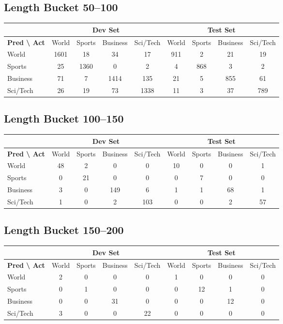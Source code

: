 \documentclass[12pt,a4paper,english]{article}
\begin{document}
\subsection{Length Bucket 50--100}
\begin{tabular}{|l|cccc|cccc|}
\hline
 & \multicolumn{4}{c|}{Dev Set} & \multicolumn{4}{c|}{Test Set} \\ \hline
\textbf{Pred \textbackslash{} Act} & World & Sports & Business & Sci/Tech & World & Sports & Business & Sci/Tech \\ \hline
World    & 1601 & 18  & 34  & 17  & 911 & 2   & 21  & 19 \\
Sports   & 25   & 1360& 0   & 2   & 4   & 868 & 3   & 2  \\
Business & 71   & 7   & 1414& 135 & 21  & 5   & 855 & 61 \\
Sci/Tech & 26   & 19  & 73  & 1338& 11  & 3   & 37  & 789\\ \hline
\end{tabular}

\subsection{Length Bucket 100--150}
\begin{tabular}{|l|cccc|cccc|}
\hline
 & \multicolumn{4}{c|}{Dev Set} & \multicolumn{4}{c|}{Test Set} \\ \hline
\textbf{Pred \textbackslash{} Act} & World & Sports & Business & Sci/Tech & World & Sports & Business & Sci/Tech \\ \hline
World    & 48 & 2 & 0 & 0 & 10 & 0 & 0 & 1 \\
Sports   & 0  & 21& 0 & 0 & 0  & 7 & 0 & 0 \\
Business & 3  & 0 & 149 & 6 & 1  & 1 & 68 & 1 \\
Sci/Tech & 1  & 0 & 2   & 103& 0  & 0 & 2  & 57\\ \hline
\end{tabular}

\subsection{Length Bucket 150--200}
\begin{tabular}{|l|cccc|cccc|}
\hline
 & \multicolumn{4}{c|}{Dev Set} & \multicolumn{4}{c|}{Test Set} \\ \hline
\textbf{Pred \textbackslash{} Act} & World & Sports & Business & Sci/Tech & World & Sports & Business & Sci/Tech \\ \hline
World    & 2 & 0 & 0 & 0 & 1 & 0 & 0 & 0 \\
Sports   & 0 & 1 & 0 & 0 & 0 & 12& 1 & 0 \\
Business & 0 & 0 & 31& 0 & 0 & 0 & 12& 0 \\
Sci/Tech & 3 & 0 & 0 & 22& 0 & 0 & 0 & 0 \\ \hline
\end{tabular}
\end{document}
